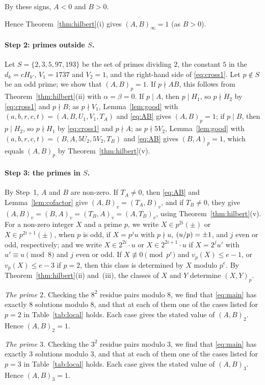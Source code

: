 \documentclass[11pt]{article}
\newcommand{\leg}[2]{\mathchoice{\biggl(\dfrac{#1}{#2}\biggr)}{(#1/#2)}{(#1/#2)}{(#1/#2)}}
\begin{document}
By these signs, $A<0$ and $B>0$.

Hence Theorem~\ref{thm:hilbert}(i) gives $(A,B)_\infty=1$ (as $B>0$).

\paragraph{Step 2: primes outside $S$.} Let $S=\{2,3,5,97,193\}$ be the set of primes dividing $2$, the constant $5$ in the $d_k=cH_{k'}$, $V_{1}=1737$ and $V_{2}=1$, and the right-hand side of \eqref{eq:cross1}. Let $p\notin S$ be an odd prime; we show that $(A,B)_p=1$. If $p\nmid AB$, this follows from Theorem~\ref{thm:hilbert}(ii) with $\alpha=\beta=0$. If $p\mid A$, then $p\mid H_{1}$, so $p\nmid H_{2}$ by \eqref{eq:cross1} and $p\nmid B$; as $p\nmid V_{1}$, Lemma~\ref{lem:good} with $(a,b,r,c,t)=(A,B,U_{1},V_{1},T_A)$ and \eqref{eq:AB} gives $(A,B)_p=1$; if $p\mid B$, then $p\mid H_{2}$, so $p\nmid H_{1}$ by \eqref{eq:cross1} and $p\nmid A$; as $p\nmid 5V_{2}$, Lemma~\ref{lem:good} with $(a,b,r,c,t)=(B,A,5U_{2},5V_{2},T_B)$ and \eqref{eq:AB} gives $(B,A)_p=1$, which equals $(A,B)_p$ by Theorem~\ref{thm:hilbert}(v).

\paragraph{Step 3: the primes in $S$.} By Step~1, $A$ and $B$ are non-zero. If $T_A\neq0$, then \eqref{eq:AB} and Lemma~\ref{lem:cofactor} give $(A,B)_v=(T_A,B)_v$, and if $T_B\neq0$, they give $(A,B)_v=(B,A)_v=(T_B,A)_v=(A,T_B)_v$, using Theorem~\ref{thm:hilbert}(v). For a non-zero integer $X$ and a prime $p$, we write $X\in p^{2i}(\pm)$ or $X\in p^{2i+1}(\pm)$, when $p$ is odd, if $X=p^ju$ with $p\nmid u$, $\leg{u}{p}=\pm1$, and $j$ even or odd, respectively; and we write $X\in2^{2i}\cdot u$ or $X\in2^{2i+1}\cdot u$ if $X=2^ju'$ with $u'\equiv u\pmod 8$ and $j$ even or odd. If $X\not\equiv0\pmod{p^e}$ and $v_p(X)\leq e-1$, or $v_p(X)\leq e-3$ if $p=2$, then this class is determined by $X$ modulo $p^e$. By Theorem~\ref{thm:hilbert}(ii) and~(iii), the classes of $X$ and $Y$ determine $(X,Y)_p$.

\emph{The prime $2$.} Checking the $8^2$ residue pairs modulo $8$, we find that \eqref{eq:main} has exactly 8 solutions modulo $8$, and that at each of them one of the cases listed for $p=2$ in Table~\ref{tab:local} holds. Each case gives the stated value of $(A,B)_{2}$. Hence $(A,B)_{2}=1$.

\emph{The prime $3$.} Checking the $3^2$ residue pairs modulo $3$, we find that \eqref{eq:main} has exactly 3 solutions modulo $3$, and that at each of them one of the cases listed for $p=3$ in Table~\ref{tab:local} holds. Each case gives the stated value of $(A,B)_{3}$. Hence $(A,B)_{3}=1$.
\end{document}
